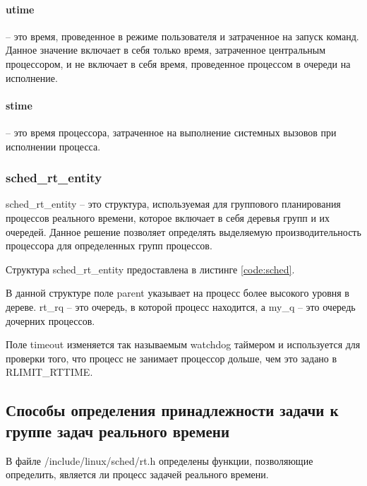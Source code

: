 \paragraph*{utime} -- это время, проведенное в режиме пользователя и затраченное на запуск команд. Данное значение включает в себя только время, затраченное центральным процессором, и не включает в себя время, проведенное процессом в очереди на исполнение.

\paragraph*{stime} -- это время процессора, затраченное на выполнение системных вызовов при исполнении процесса.

\subsubsection{sched\_rt\_entity} 
sched\_rt\_entity -- это структура, используемая для группового планирования процессов реального времени, которое включает в себя деревья групп и их очередей. Данное решение позволяет определять выделяемую производительность процессора для определенных групп процессов.

Структура sched\_rt\_entity предоставлена в листинге \ref{code:sched}.


В данной структуре поле parent указывает на процесс более высокого уровня в дереве. rt\_rq -- это очередь, в которой процесс находится, а my\_q -- это очередь дочерних процессов.

Поле timeout изменяется так называемым watchdog таймером и используется для проверки того, что процесс не занимает процессор дольше, чем это задано в RLIMIT\_RTTIME.

\subsection{Способы определения принадлежности задачи к группе задач реального времени}
В файле /include/linux/sched/rt.h определены функции, позволяющие определить, является ли процесс задачей реального времени.

